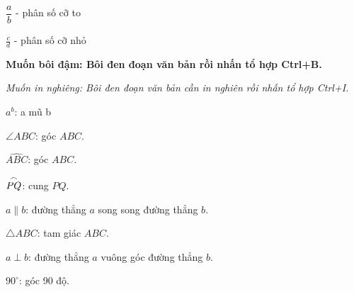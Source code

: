 \documentclass[12pt,a4paper,openany ]{book}
\begin{document}
$\dfrac{a}{b}$ - phân số cỡ to

$\frac{c}{d}$ - phân số cỡ nhỏ 

\textbf{Muốn bôi đậm: Bôi đen đoạn văn bản rồi nhấn tổ hợp Ctrl+B.}

\textit{Muốn in nghiêng: Bôi đen đoạn văn bản cần in nghiên rồi nhấn tổ hợp Ctrl+I.}

$a^b$: a mũ b

$\angle ABC$: góc $ABC$.

$\widehat{ABC}$: góc $ABC$. 

$\overset{\huge\frown}{PQ}$: cung $PQ$. 

$ a\parallel b$: đường thẳng $a$ song song đường thẳng $b$. 

$\bigtriangleup ABC$: tam giác $ABC$. 

$a\perp b$: đường thẳng $a$ vuông góc đường thẳng $b$. 

$90^\circ$: góc 90 độ. 







              
\end{document}
